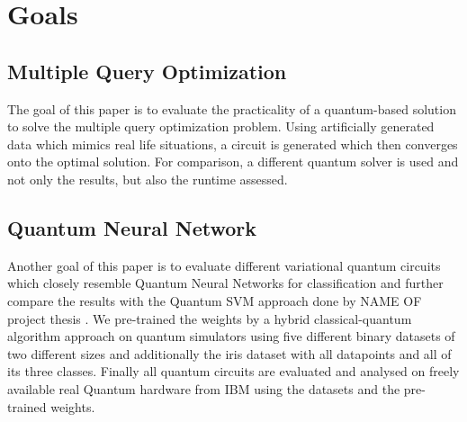 \section{Goals}

\subsection{Multiple Query Optimization}
The goal of this paper is to evaluate the practicality of a quantum-based solution to solve the multiple query optimization problem. Using artificially generated data which mimics real life situations, a circuit is generated which then converges onto the optimal solution. For comparison, a different quantum solver is used and not only the results, but also the runtime assessed.

\subsection{Quantum Neural Network}
Another goal of this paper is to evaluate different variational quantum circuits which closely resemble Quantum Neural Networks for classification and further compare the results with the Quantum SVM approach done by NAME OF project thesis . We pre-trained the weights by a hybrid classical-quantum algorithm approach on quantum simulators using five different binary datasets of two different sizes and additionally the iris dataset with all datapoints and all of its three classes. Finally all quantum circuits are evaluated and analysed on freely available real Quantum hardware from IBM using the datasets and the pre-trained weights.

\clearpage
